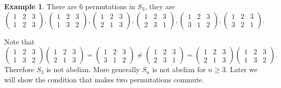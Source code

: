 \documentclass[12pt]{book}
\theoremstyle{definition}
\newtheorem{example}{Example}[section]
\theoremstyle{remark}
\begin{document}
				\begin{example}
					There are 6 permutations in $S_3$, they are
					\begin{equation*}
					\begin{pmatrix}
					1 & 2 & 3\\
					1 & 2 & 3
					\end{pmatrix}, 
					\begin{pmatrix}
					1 & 2 & 3\\
					1 & 3 & 2
					\end{pmatrix}, 
					\begin{pmatrix}
					1 & 2 & 3\\
					2 & 1 & 3
					\end{pmatrix}, 
					\begin{pmatrix}
					1 & 2 & 3\\
					2 & 3 & 1
					\end{pmatrix}, 
					\begin{pmatrix}
					1 & 2 & 3\\
					3 & 1 & 2
					\end{pmatrix},
					\begin{pmatrix}
					1 & 2 & 3\\
					3 & 2 & 1
					\end{pmatrix}.
					\end{equation*}
				\end{example}
			Note that
			\begin{equation*}
				\begin{pmatrix}
					1 & 2 & 3 \\
					1 & 3 & 2
				\end{pmatrix}
				\begin{pmatrix}
				1 & 2 & 3 \\
				2 & 1 & 3
				\end{pmatrix}
				= \begin{pmatrix}
				1 & 2 & 3 \\
				3 & 1 & 2
				\end{pmatrix}
				\neq
				\begin{pmatrix}
				1 & 2 & 3 \\
				2 & 3 & 1
				\end{pmatrix}
				= 	\begin{pmatrix}
				1 & 2 & 3 \\
				2 & 1 & 3
				\end{pmatrix}
				\begin{pmatrix}
				1 & 2 & 3 \\
				1 & 3 & 2
				\end{pmatrix}.
			\end{equation*}
			Therefore $S_3$ is not abelian. More generally $S_n$ is not abelian for $n \geq 3$. Later we will show the condition that makes two permutations commute.
			
\end{document}
